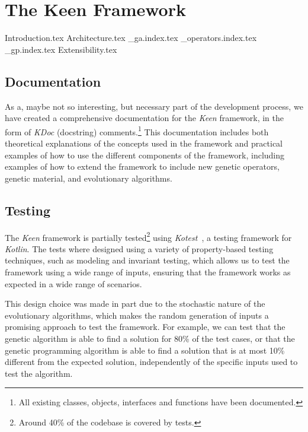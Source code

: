 
\chapter{The Keen Framework}
\label{chap:keen}
    {Introduction.tex}
    {Architecture.tex}
    {_ga.index.tex}
    {_operators.index.tex}
    {_gp.index.tex}
    {Extensibility.tex}

    \section{Documentation}
        As a, maybe not so interesting, but necessary part of the development process, we have created a comprehensive
        documentation for the \textit{Keen} framework, in the form of \textit{KDoc} (docstring) comments.\footnote{
            All existing classes, objects, interfaces and functions have been documented.
        }
        This
        documentation includes both theoretical explanations of the concepts used in the framework and practical
        examples of how to use the different components of the framework, including examples of how to extend the
        framework to include new genetic operators, genetic material, and evolutionary algorithms.

    \section{Testing}
        The \textit{Keen} framework is partially tested\footnote{
            Around 40\% of the codebase is covered by tests.
        } using \textit{Kotest}~\autocite{KotestKotesta}, a testing framework for \textit{Kotlin}. The tests where 
        designed using a variety of property-based testing techniques, such as modeling and invariant testing, which
        allows us to test the framework using a wide range of inputs, ensuring that the framework works as expected in a
        wide range of scenarios.

        This design choice was made in part due to the stochastic nature of the evolutionary algorithms, which makes the
        random generation of inputs a promising approach to test the framework. For example, we can test that the
        genetic algorithm is able to find a solution for 80\% of the test cases, or that the genetic programming
        algorithm is able to find a solution that is at most 10\% different from the expected solution, independently of
        the specific inputs used to test the algorithm.

